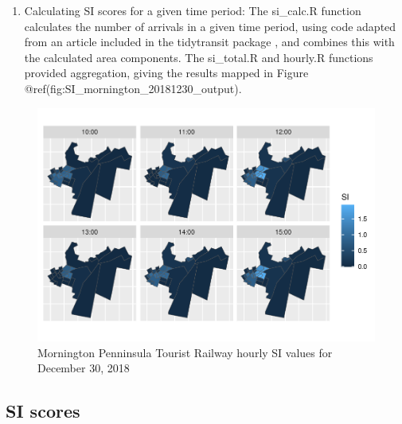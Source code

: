\documentclass[preprint, 3p,
authoryear]{elsarticle} %
\providecommand{\tightlist}{%
  \setlength{\itemsep}{0pt}\setlength{\parskip}{0pt}}
\begin{document}
\begin{enumerate}
\def\labelenumi{(\arabic{enumi})}
\setcounter{enumi}{3}
\tightlist
\item
  Calculating SI scores for a given time period: The si\_calc.R function
  calculates the number of arrivals in a given time period, using code
  adapted from an article included in the tidytransit package
  \citep{tidytransit_departure_timetable}, and combines this with the
  calculated area components. The si\_total.R and hourly.R functions
  provided aggregation, giving the results mapped in Figure
  @ref(fig:SI\_mornington\_20181230\_output).
\end{enumerate}

\begin{figure}
\centering
\includegraphics{Leveraging_GTFS_to_assess_transit_supply_Transport_Geography_files/figure-latex/SI_mornington_20181230_output-1.pdf}
\caption{Mornington Penninsula Tourist Railway hourly SI values for
December 30, 2018}
\end{figure}

\hypertarget{si-scores}{%
\subsection{SI scores}\label{si-scores}}
\end{document}
